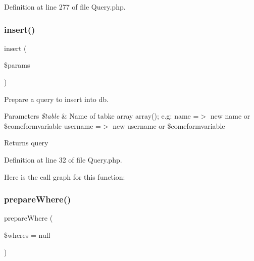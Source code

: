 Definition at line 277 of file Query.\+php.

\mbox{\label{class_zest_1_1_database_1_1_query_1_1_query_a67366620fdfeaab4b480b6e4dca64deb}} 
\subsubsection{\texorpdfstring{insert()}{insert()}}
{\footnotesize\ttfamily insert (\begin{DoxyParamCaption}\item[{}]{\$params }\end{DoxyParamCaption})}

Prepare a query to insert into db.


\begin{DoxyParams}{Parameters}
{\em \$table} & Name of tabke array array(); e.\+g\+: \textquotesingle{}name\textquotesingle{} =$>$ \textquotesingle{}new name\textquotesingle{} or \$comeformvariable \textquotesingle{}username\textquotesingle{} =$>$ \textquotesingle{}new username\textquotesingle{} or \$comeformvariable\\
\hline
\end{DoxyParams}
\begin{DoxyReturn}{Returns}
query 
\end{DoxyReturn}


Definition at line 32 of file Query.\+php.

Here is the call graph for this function\+:
\mbox{\label{class_zest_1_1_database_1_1_query_1_1_query_afdf795c4c3d555cc515a24249a80919b}} 
\subsubsection{\texorpdfstring{prepare\+Where()}{prepareWhere()}}
{\footnotesize\ttfamily prepare\+Where (\begin{DoxyParamCaption}\item[{}]{\$wheres = {\ttfamily null} }\end{DoxyParamCaption})}

